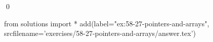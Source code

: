 
\begin{ex}
  \label{ex:58-27-pointers-and-arrays}
  
  \qed
\end{ex}
\begin{python0}
from solutions import *
add(label="ex:58-27-pointers-and-arrays",
    srcfilename='exercises/58-27-pointers-and-arrays/answer.tex')
\end{python0}
